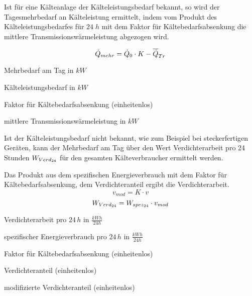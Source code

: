 Ist f\"ur eine K\"alteanlage der K\"alteleistungsbedarf bekannt, so wird der
Tagesmehrbedarf an K\"alteleistung ermittelt, indem vom Produkt des
K\"alteleistungsbedarfes f\"ur $24\;h$ mit dem Faktor f\"ur
K\"altebedarfsabsenkung die mittlere Transmissionswärmeleistung abgezogen wird.

\begin{equation}
	\pmehr = \pkalt \cdot K - \aptrans
\label{pmehr}
\end{equation}

\begin{description}[\dth]

	\item[$\pmehr$] Mehrbedarf am Tag in $kW$
	\item[$\pkalt$] Kälteleistungsbedarf in $kW$
	\item[$K$] Faktor für Kältebedarfsabsenkung (einheitenlos)
	\item[$\aptrans$] mittlere Transmissionswärmeleistung in $kW$

\end{description}
\vspace{0.5cm}

Ist der Kälteleistungsbedarf nicht bekannt, wie zum Beispiel bei steckerfertigen
Geräten, kann der Mehrbedarf am Tag \"uber den Wert Verdichterarbeit pro 24
Stunden $\lverd$ für den gesamten Kälteverbraucher ermittelt werden.

Das Produkt aus dem spezifischen Energieverbrauch mit dem Faktor für
Kältebedarfsabsenkung, dem Verdichteranteil ergibt die Verdichterarbeit.
\begin{equation}
	v_{mod} = K \cdot v
\label{vmod}
\end{equation}
\begin{equation}
	\lverd = \lspez \cdot v_{mod}
\label{lverd}
\end{equation}

\begin{description}[\dth]

	\item[$\lverd$] Verdichterarbeit pro $24\,h$ in $\frac{kWh}{24h}$
	\item[$\lspez$] spezifischer Energieverbrauch pro $24\,h$ in
		$\frac{kWh}{24h}$
	\item[$K$] Faktor für Kältebedarfsabsenkung (einheitenlos)
	\item[$v$] Verdichteranteil (einheitenlos)
	\item[$v_{mod}$] modifizierte Verdichteranteil (einheitenlos)

\end{description}
\vspace{0.5cm}

